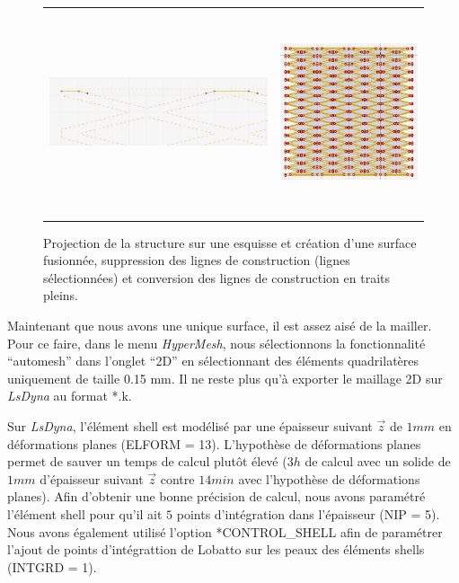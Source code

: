 \documentclass[a4paper]{article}
\begin{document}
	\begin{figure}[H]
		\centering
		\begin{tabular}{m{10cm}m{6cm}}
			\includegraphics[height=3cm]{Images/8/8_1/hm_lignes_construction.png} & \includegraphics[height=6cm]{Images/8/8_1/hm_traits_pleins.png}\\
		\end{tabular}
		\caption{Projection de la structure sur une esquisse et création d’une surface fusionnée, suppression des lignes de construction (lignes sélectionnées) et conversion des lignes de construction en traits pleins.}
	\end{figure}
	
	\hspace{0.5cm}Maintenant que nous avons une unique surface, il est assez aisé de la mailler. Pour ce faire, dans le menu \textit{HyperMesh}, nous sélectionnons la fonctionnalité “automesh” dans l'onglet “2D” en sélectionnant des éléments quadrilatères uniquement de taille 0.15 mm. Il ne reste plus qu’à exporter le maillage 2D sur \textit{LsDyna} au format *.k.
	
	\hspace{0.5cm}Sur \textit{LsDyna}, l'élément shell est modélisé par une épaisseur suivant $\vec{z}$ de $1 mm$ en déformations planes (ELFORM = 13). L'hypothèse de déformations planes permet de sauver un temps de calcul plutôt élevé ($3 h$ de calcul avec un solide de $1 mm$ d'épaisseur suivant $\vec{z}$ contre $14 min$ avec l'hypothèse de déformations planes). Afin d'obtenir une bonne précision de calcul, nous avons paramétré l'élément shell pour qu'il ait $5$ points d'intégration dans l'épaisseur (NIP = 5). Nous avons également utilisé l'option *CONTROL\_SHELL afin de paramétrer l'ajout de points d'intégrattion de Lobatto sur les peaux des éléments shells (INTGRD = 1).
	
\end{document}
